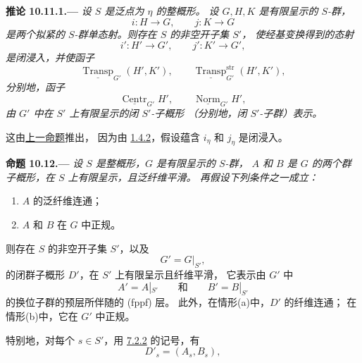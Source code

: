 
\medskip
{}\label{cor:sga3-VIB-10.11.1}%
\noindent\textbf{推论 10.11.1.---}
\begingroup\itshape
设 \(S\) 是泛点为 \(\eta\) 的整概形。
设 \(G,H,K\) 是有限呈示的 \(S\)-群，
\[
  i:H\longrightarrow G,
  \qquad
  j:K\longrightarrow G
\]
是两个拟紧的 \(S\)-群单态射。则存在 \(S\) 的非空开子集 \(S'\)，
使经基变换得到的态射
\[
  i':H'\longrightarrow G',
  \qquad
  j':K'\longrightarrow G',
\]
是闭浸入，并使函子
\label{form:sga3-VIB-10.11.1-transporter-functors}%
\[
  \underline{\operatorname{Transp}}_{G'}(H',K'),
  \qquad
  \underline{\operatorname{Transp}}^{\mathrm{str}}_{G'}(H',K'),
\]
分别地，函子
\label{form:sga3-VIB-10.11.1-centralizer-normalizer}%
\[
  \underline{\operatorname{Centr}}_{G'}H',
  \qquad
  \underline{\operatorname{Norm}}_{G'}H',
\]
由 \(G'\) 中在 \(S'\) 上有限呈示的闭 \(S'\)-子概形
\textup{（分别地，闭 \(S'\)-子群）}表示。
\par\endgroup

这由\hyperref[prop:sga3-VIB-10.11]{上一命题}推出，
因为由 \hyperref[cor:sga3-VIB-1.4.2]{1.4.2}，假设蕴含
\(i_\eta\) 和 \(j_\eta\) 是闭浸入。

\medskip
{}\label{prop:sga3-VIB-10.12}%
\noindent\textbf{命题 10.12.---}
\begingroup\itshape
设 \(S\) 是整概形，\(G\) 是有限呈示的 \(S\)-群，
\(A\) 和 \(B\) 是 \(G\) 的两个群子概形，在 \(S\) 上有限呈示，且泛纤维平滑。
再假设下列条件之一成立：
\begin{enumerate}
\item[\textup{a)}]\label{cond:sga3-VIB-10.12-a}
  \(A\) 的泛纤维连通；
\item[\textup{b)}]\label{cond:sga3-VIB-10.12-b}
  \(A\) 和 \(B\) 在 \(G\) 中正规。
\end{enumerate}
则存在 \(S\) 的非空开子集 \(S'\)，以及
\[
  G'=G|_{S'},
\]
的闭群子概形 \(D'\)，在 \(S'\) 上有限呈示且纤维平滑，
它表示由 \(G'\) 中
\[
  A'=A|_{S'}
  \qquad\text{和}\qquad
  B'=B|_{S'}
\]
的换位子群的预层所伴随的 \textup{(fppf)} 层。
此外，在情形\textup{(a)}中，\(D'\) 的纤维连通；
在情形\textup{(b)}中，它在 \(G'\) 中正规。

特别地，对每个 \(s\in S'\)，用 \hyperref[def:sga3-VIB-7.2.2]{7.2.2} 的记号，有
\[
  D'_s=(A_s,B_s),
\]
\par\endgroup

